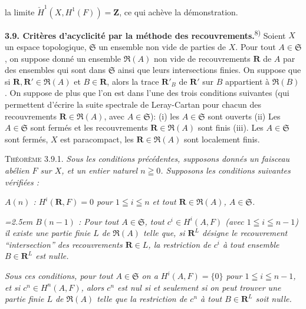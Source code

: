 
\noindent la limite $\check H^1(X,H^1(F))=\mathbf Z$, ce qui achève la
démonstration.

\textbf{3.9. Critères d'acyclicité par la méthode des
recouvrements.}\textsuperscript{8)}
Soient $X$ un espace topologique, $\mathfrak S$ un ensemble non vide de parties
de $X$. Pour tout $A\in\mathfrak S$, on suppose donné un ensemble
$\mathfrak R(A)$ non vide de recouvrements $\mathbf R$ de $A$ par des
ensembles qui sont dans $\mathfrak S$ ainsi que leurs intersections finies. On
suppose que si $\mathbf R,\mathbf R'\in\mathfrak R(A)$ et
$B\in\mathbf R$, alors la trace $\mathbf R'_B$ de $\mathbf R'$ sur $B$
appartient à $\mathfrak R(B)$.
On suppose de plus que l'on est dans l'une des trois conditions suivantes
(qui permettent d'écrire la suite spectrale de Leray-Cartan pour chacun des
recouvrements $\mathbf R\in\mathfrak R(A)$, avec $A\in\mathfrak S$): (i) les
$A\in\mathfrak S$ sont ouverts (ii) Les $A\in\mathfrak S$ sont fermés et les
recouvrements $\mathbf R\in\mathfrak R(A)$ sont finis (iii). Les
$A\in\mathfrak S$ sont fermés, $X$ est paracompact, les
$\mathbf R\in\mathfrak R(A)$ sont localement finis.

\textsc{Théorème 3.9.1.} \textit{Sous les conditions précédentes,
supposons donnés un faisceau abélien $F$ sur $X$, et un entier naturel
$n\geqq 0$. Supposons les conditions suivantes vérifiées :}

\begingroup\itshape
$A(n)$ : $H^i(\mathbf R,F)=0$ pour $1\leqq i\leqq n$ et tout
$\mathbf R\in\mathfrak R(A)$, $A\in\mathfrak S$.\par
\endgroup

\begingroup\itshape\hangindent=2.5em
$B(n-1)$ : Pour tout $A\in\mathfrak S$, tout $c^i\in H^i(A,F)$ \textup{(}avec
$1\leqq i\leqq n-1$\textup{)} il existe une partie finie $L$ de $\mathfrak R(A)$ telle
que, si $\mathbf R^L$ désigne le recouvrement ``intersection'' des
recouvrements $\mathbf R\in L$, la restriction de $c^i$ à tout ensemble
$B\in\mathbf R^L$ est nulle.\par
\endgroup

\noindent\textit{Sous ces conditions, pour tout $A\in\mathfrak S$ on a
$H^i(A,F)=\{0\}$ pour $1\leqq i\leqq n-1$, et si $c^n\in H^n(A,F)$, alors
$c^n$ est nul si et seulement si on peut trouver une partie finie $L$ de
$\mathfrak R(A)$ telle que la restriction de $c^n$ à tout
$B\in\mathbf R^L$ soit nulle.}

